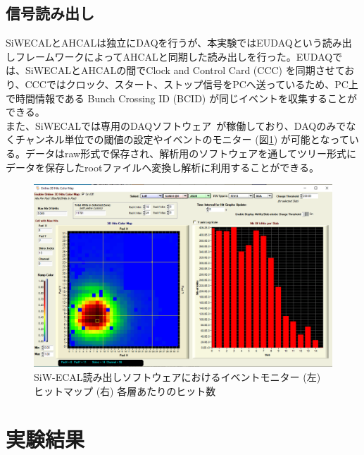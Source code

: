 \subsection{信号読み出し}
SiWECALとAHCALは独立にDAQを行うが、本実験ではEUDAQという読み出しフレームワークによってAHCALと同期した読み出しを行った。EUDAQでは、SiWECALとAHCALの間でClock and Control Card (CCC) を同期させており、CCCではクロック、スタート、ストップ信号をPCへ送っているため、PC上で時間情報である Bunch Crossing ID (BCID) が同じイベントを収集することができる。\\
また、SiWECALでは専用のDAQソフトウェア~\cite{ecalsoft}が稼働しており、DAQのみでなくチャンネル単位での閾値の設定やイベントのモニター (図\ref{monitor}) が可能となっている。データはraw形式で保存され、解析用のソフトウェアを通してツリー形式にデータを保存したrootファイルへ変換し解析に利用することができる。
\begin{figure}[H]
\begin{center}
 \includegraphics[keepaspectratio, scale=0.2]
 	{Figure/Beamtest/monitor.png}
 		\caption[SiW-ECALのイベントモニター]{SiW-ECAL読み出しソフトウェアにおけるイベントモニター (左) ヒットマップ (右) 各層あたりのヒット数}
		\label{monitor}
\end{center}
\end{figure}
\section{実験結果}
